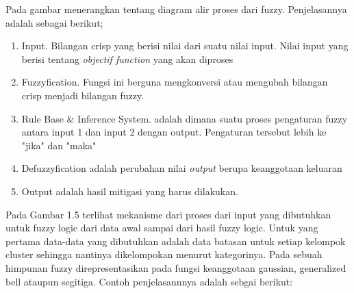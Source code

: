 \documentclass[11pt]{article}
\numberwithin{equation}{subsection}
\begin{document}
Pada gambar menerangkan tentang diagram alir proses dari fuzzy. Penjelasannya adalah sebagai berikut;
\begin{enumerate}[label=\alph*.]
	\item Input. Bilangan crisp yang berisi nilai dari suatu nilai input. Nilai input yang berisi tentang \textit{objectif function} yang akan diproses
	\item Fuzzyfication. Fungsi ini berguna mengkonversi atau mengubah bilangan crisp menjadi bilangan fuzzy.
	\item Rule Base \& Inference System. adalah dimana suatu proses pengaturan fuzzy antara input 1 dan input 2 dengan output. Pengaturan tersebut lebih ke "jika" dan "maka"
	\item Defuzzyfication adalah perubahan nilai \textit{output} berupa keanggotaan keluaran
	\item Output adalah hasil mitigasi yang harus dilakukan.
\end{enumerate}
Pada Gambar 1.5 terlihat mekanisme dari proses dari input yang dibutuhkan untuk fuzzy logic dari data awal sampai dari hasil fuzzy logic.
Untuk yang pertama data-data yang dibutuhkan adalah data batasan untuk setiap kelompok cluster sehingga nantinya dikelompokan menurut kategorinya.
Pada sebuah himpunan fuzzy  direpresentasikan pada fungsi keanggotaan gaussian, generalized bell ataupun segitiga.
Contoh penjelasannnya adalah sebgai berikut:
\end{document}
